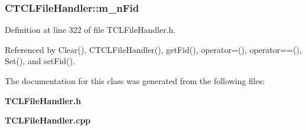 \subsubsection{ CTCLFile\-Handler::m\_\-n\-Fid\hspace{0.3cm}{\tt  [private]}}\label{classCTCLFileHandler_o0}




Definition at line 322 of file TCLFile\-Handler.h.

Referenced by Clear(), CTCLFile\-Handler(), get\-Fid(), operator=(), operator==(), Set(), and set\-Fid().

The documentation for this class was generated from the following files:\begin{CompactItemize}
\item 
{\bf TCLFile\-Handler.h}\item 
{\bf TCLFile\-Handler.cpp}\end{CompactItemize}
